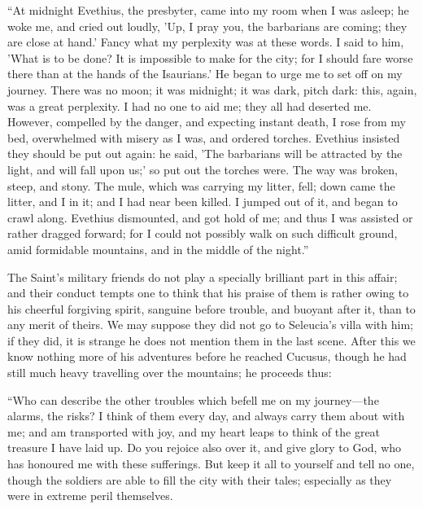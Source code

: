 ``At midnight Evethius, the presbyter, came into my room when I
was asleep; he woke me, and cried out loudly, 'Up, I pray you, the
barbarians are coming; they are close at hand.' Fancy what my
perplexity was at these words. I said to him, 'What is to be
done? It is impossible to make for the city; for
I should fare worse there than at the hands of the Isaurians.' He
began to urge me to set off on my journey. There was no moon; it was
midnight; it was dark, pitch dark: this, again, was a great
perplexity. I had no one to aid me; they all had deserted me. However,
compelled by the danger, and expecting instant death, I rose from my
bed, overwhelmed with misery as I was, and ordered torches. Evethius
insisted they should be put out again: he said, 'The barbarians will
be attracted by the light, and will fall upon us;' so put out the
torches were. The way was broken, steep, and stony. The mule, which
was carrying my litter, fell; down came the litter, and I in it; and I
had near been killed. I jumped out of it, and began to crawl along.
Evethius dismounted, and got hold of me; and thus I was assisted or
rather dragged forward; for I could not possibly walk on such
difficult ground, amid formidable mountains, and in the middle of the
night.''

The Saint's military friends do not play a specially brilliant part
in this affair; and their conduct tempts one to think that his praise
of them is rather owing to his cheerful forgiving spirit, sanguine
before trouble, and buoyant after it, than to any merit of theirs. We
may suppose they did not go to Seleucia's villa with him; if they did,
it is strange he does not mention them in the last scene. After this
we know nothing more of his adventures before he reached Cucusus,
though he had still much heavy travelling over the mountains; he
proceeds thus:

``Who can describe the other troubles which befell me on my
journey—the alarms, the risks? I think of them every day, and always
carry them about with me; and am transported with joy, and my heart
leaps to think of the great treasure I have laid up. Do you rejoice
also over it, and give glory to God, who has honoured me with these
sufferings. But keep it all to yourself and tell no one, though the
soldiers are able to fill the city with their tales; especially as
they were in extreme peril themselves.

